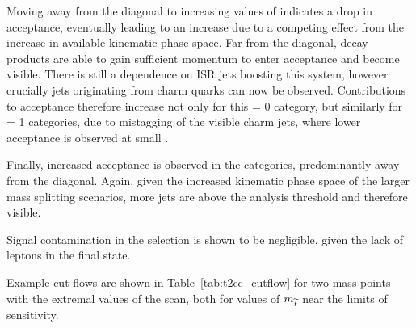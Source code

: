 Moving away from the 
diagonal to increasing values of \deltam indicates a drop in acceptance, 
eventually leading to an increase due to a competing effect from the increase in
available kinematic phase space. Far from the diagonal, decay products are able 
to gain sufficient momentum to enter acceptance and become visible. There
is still a dependence on ISR jets boosting this system, however crucially jets 
originating from charm quarks can now be observed. Contributions to acceptance
therefore increase not only for this \nb= 0 category, but similarly for \nb= 1
categories, due to mistagging of the visible charm jets, where lower
acceptance is observed at small \deltam.

Finally, increased acceptance is observed in the \njhigh categories, 
predominantly away from the diagonal. Again, given the increased kinematic phase
space of the larger mass splitting scenarios, more jets are above the analysis
threshold and therefore visible.


Signal contamination in the \mj selection is shown to be negligible, given the 
lack of leptons in the final state.

Example cut-flows are shown in Table~\ref{tab:t2cc_cutflow} for two mass points
with the extremal \deltam values of the scan, both for values of $m_{\widetilde{t}}$
near the limits of sensitivity.

